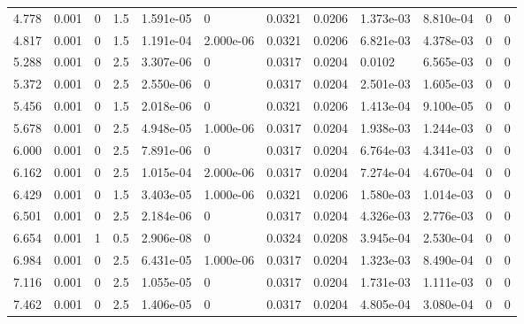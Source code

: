 \documentclass[preview]{standalone}
\begin{document}
{{\begin{tabular}{L{1.2cm}C{1.2cm} C{0.3cm}C{0.5cm} C{1.4cm}C{1.4cm} C{1.4cm}C{1.4cm} C{1.6cm}C{1.6cm} C{1.6cm}C{1.6cm}}
  4.778  &  0.001  & 0     & 1.5 &  1.591e-05  & 0  &  0.0321&   0.0206& 1.373e-03 & 8.810e-04   &  0 & 0  \\ 
  4.817  &  0.001  & 0     & 1.5 &  1.191e-04  & 2.000e-06  &  0.0321&   0.0206& 6.821e-03 & 4.378e-03   &  0 & 0  \\ 
  5.288  &  0.001  & 0     & 2.5 &  3.307e-06  & 0  &  0.0317&   0.0204& 0.0102 & 6.565e-03   &  0 & 0  \\ 
  5.372  &  0.001  & 0     & 2.5 &  2.550e-06  & 0  &  0.0317&   0.0204& 2.501e-03 & 1.605e-03   &  0 & 0  \\ 
  5.456  &  0.001  & 0     & 1.5 &  2.018e-06  & 0  &  0.0321&   0.0206& 1.413e-04 & 9.100e-05   &  0 & 0  \\ 
  5.678  &  0.001  & 0     & 2.5 &  4.948e-05  & 1.000e-06  &  0.0317&   0.0204& 1.938e-03 & 1.244e-03   &  0 & 0  \\ 
  6.000  &  0.001  & 0     & 2.5 &  7.891e-06  & 0  &  0.0317&   0.0204& 6.764e-03 & 4.341e-03   &  0 & 0  \\ 
  6.162  &  0.001  & 0     & 2.5 &  1.015e-04  & 2.000e-06  &  0.0317&   0.0204& 7.274e-04 & 4.670e-04   &  0 & 0  \\ 
  6.429  &  0.001  & 0     & 1.5 &  3.403e-05  & 1.000e-06  &  0.0321&   0.0206& 1.580e-03 & 1.014e-03   &  0 & 0  \\ 
  6.501  &  0.001  & 0     & 2.5 &  2.184e-06  & 0  &  0.0317&   0.0204& 4.326e-03 & 2.776e-03   &  0 & 0  \\ 
  6.654  &  0.001  & 1     & 0.5 &  2.906e-08  & 0  &  0.0324&   0.0208& 3.945e-04 & 2.530e-04   &  0 & 0  \\ 
  6.984  &  0.001  & 0     & 2.5 &  6.431e-05  & 1.000e-06  &  0.0317&   0.0204& 1.323e-03 & 8.490e-04   &  0 & 0  \\ 
  7.116  &  0.001  & 0     & 2.5 &  1.055e-05  & 0  &  0.0317&   0.0204& 1.731e-03 & 1.111e-03   &  0 & 0  \\ 
  7.462  &  0.001  & 0     & 2.5 &  1.406e-05  & 0  &  0.0317&   0.0204& 4.805e-04 & 3.080e-04   &  0 & 0  \\ 
\hline 
\end{tabular} 

}}
\end{document}
